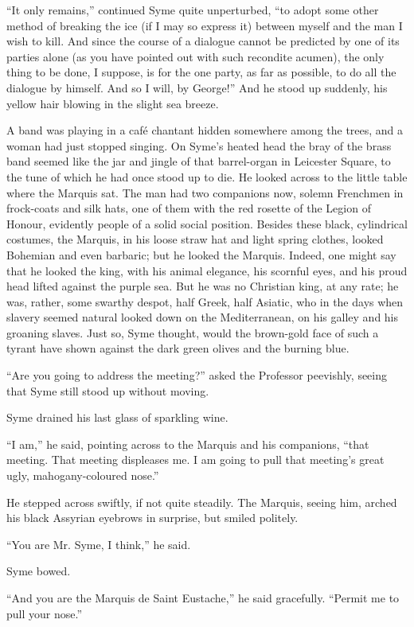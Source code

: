 “It only remains,” continued Syme quite unperturbed, “to adopt some other method of breaking the ice (if I may so express it) between myself and the man I wish to kill. And since the course of a dialogue cannot be predicted by one of its parties alone (as you have pointed out with such recondite acumen), the only thing to be done, I suppose, is for the one party, as far as possible, to do all the dialogue by himself. And so I will, by George!” And he stood up suddenly, his yellow hair blowing in the slight sea breeze.

A band was playing in a café chantant hidden somewhere among the trees, and a woman had just stopped singing. On Syme’s heated head the bray of the brass band seemed like the jar and jingle of that barrel-organ in Leicester Square, to the tune of which he had once stood up to die. He looked across to the little table where the Marquis sat. The man had two companions now, solemn Frenchmen in frock-coats and silk hats, one of them with the red rosette of the Legion of Honour, evidently people of a solid social position. Besides these black, cylindrical costumes, the Marquis, in his loose straw hat and light spring clothes, looked Bohemian and even barbaric; but he looked the Marquis. Indeed, one might say that he looked the king, with his animal elegance, his scornful eyes, and his proud head lifted against the purple sea. But he was no Christian king, at any rate; he was, rather, some swarthy despot, half Greek, half Asiatic, who in the days when slavery seemed natural looked down on the Mediterranean, on his galley and his groaning slaves. Just so, Syme thought, would the brown-gold face of such a tyrant have shown against the dark green olives and the burning blue.

“Are you going to address the meeting?” asked the Professor peevishly, seeing that Syme still stood up without moving.

Syme drained his last glass of sparkling wine.

“I am,” he said, pointing across to the Marquis and his companions, “that meeting. That meeting displeases me. I am going to pull that meeting’s great ugly, mahogany-coloured nose.”

He stepped across swiftly, if not quite steadily. The Marquis, seeing him, arched his black Assyrian eyebrows in surprise, but smiled politely.

“You are Mr. Syme, I think,” he said.

Syme bowed.

“And you are the Marquis de Saint Eustache,” he said gracefully. “Permit me to pull your nose.”

